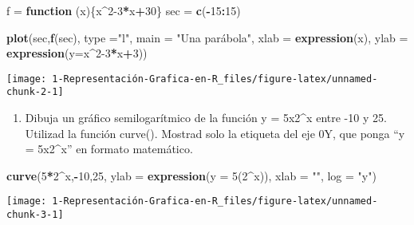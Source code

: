 \documentclass[
]{article}
\newenvironment{Shaded}{\begin{snugshade}}{\end{snugshade}}
\newcommand{\ControlFlowTok}[1]{\textcolor[rgb]{0.13,0.29,0.53}{\textbf{#1}}}
\newcommand{\DataTypeTok}[1]{\textcolor[rgb]{0.13,0.29,0.53}{#1}}
\newcommand{\DecValTok}[1]{\textcolor[rgb]{0.00,0.00,0.81}{#1}}
\newcommand{\KeywordTok}[1]{\textcolor[rgb]{0.13,0.29,0.53}{\textbf{#1}}}
\newcommand{\NormalTok}[1]{#1}
\newcommand{\OperatorTok}[1]{\textcolor[rgb]{0.81,0.36,0.00}{\textbf{#1}}}
\newcommand{\StringTok}[1]{\textcolor[rgb]{0.31,0.60,0.02}{#1}}
\providecommand{\tightlist}{%
  \setlength{\itemsep}{0pt}\setlength{\parskip}{0pt}}
\begin{document}
\begin{Shaded}
\begin{Highlighting}[]
\NormalTok{f =}\StringTok{ }\ControlFlowTok{function}\NormalTok{ (x)\{x}\OperatorTok{^}\DecValTok{2-3}\OperatorTok{*}\NormalTok{x}\OperatorTok{+}\DecValTok{30}\NormalTok{\}}
\NormalTok{sec =}\StringTok{ }\KeywordTok{c}\NormalTok{(}\OperatorTok{-}\DecValTok{15}\OperatorTok{:}\DecValTok{15}\NormalTok{)}

\KeywordTok{plot}\NormalTok{(sec,}\KeywordTok{f}\NormalTok{(sec), }
     \DataTypeTok{type =}\StringTok{"l"}\NormalTok{,}
     \DataTypeTok{main =} \StringTok{"Una parábola"}\NormalTok{,}
     \DataTypeTok{xlab =} \KeywordTok{expression}\NormalTok{(x),}
     \DataTypeTok{ylab =} \KeywordTok{expression}\NormalTok{(}\DataTypeTok{y=}\NormalTok{x}\OperatorTok{^}\DecValTok{2-3}\OperatorTok{*}\NormalTok{x}\OperatorTok{+}\DecValTok{3}\NormalTok{))}
\end{Highlighting}
\end{Shaded}

\begin{center}\texttt{[image: 1-Representación-Grafica-en-R\_files/figure-latex/unnamed-chunk-2-1]} \end{center}

\begin{enumerate}
\def\labelenumi{\arabic{enumi}.}
\setcounter{enumi}{2}
\tightlist
\item
  Dibuja un gráfico semilogarítmico de la función y = 5x2\^{}x entre -10
  y 25. Utilizad la función curve(). Mostrad solo la etiqueta del eje
  0Y, que ponga ``y = 5x2\^{}x'' en formato matemático.
\end{enumerate}

\begin{Shaded}
\begin{Highlighting}[]
\KeywordTok{curve}\NormalTok{(}\DecValTok{5}\OperatorTok{*}\DecValTok{2}\OperatorTok{^}\NormalTok{x,}\OperatorTok{-}\DecValTok{10}\NormalTok{,}\DecValTok{25}\NormalTok{, }
      \DataTypeTok{ylab =} \KeywordTok{expression}\NormalTok{(}\DataTypeTok{y =} \DecValTok{5}\NormalTok{(}\DecValTok{2}\OperatorTok{^}\NormalTok{x)),}
      \DataTypeTok{xlab =} \StringTok{""}\NormalTok{,}
      \DataTypeTok{log =} \StringTok{"y"}\NormalTok{)}
\end{Highlighting}
\end{Shaded}

\begin{center}\texttt{[image: 1-Representación-Grafica-en-R\_files/figure-latex/unnamed-chunk-3-1]} \end{center}
\end{document}

